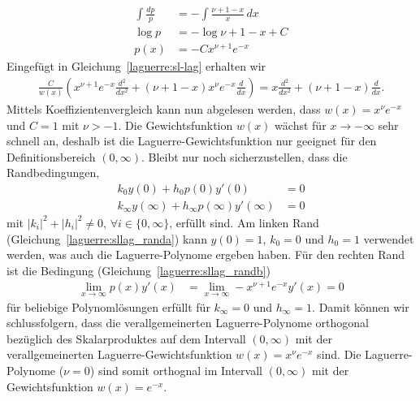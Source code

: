 \begin{align*}
\int \frac{dp}{p}
 & =
-\int \frac{\nu + 1 - x}{x} \, dx
\\
\log p
 & =
-\log \nu + 1 - x + C
\\
p(x)
 & =
-C x^{\nu + 1} e^{-x}
\end{align*}
Eingefügt in Gleichung~\eqref{laguerre:sl-lag} erhalten wir
\begin{align*}
\frac{C}{w(x)}
\left(
x^{\nu+1} e^{-x} \frac{d^2}{dx^2} +
(\nu + 1 - x) x^{\nu} e^{-x} \frac{d}{dx}
\right)
=
x \frac{d^2}{dx^2} + (\nu + 1 - x) \frac{d}{dx}.
\end{align*}
Mittels Koeffizientenvergleich kann nun abgelesen werden, dass $w(x) = x^\nu
e^{-x}$ und $C=1$ mit $\nu > -1$.
Die Gewichtsfunktion $w(x)$ wächst für $x\rightarrow-\infty$ sehr schnell an,
deshalb ist die Laguerre-Gewichtsfunktion nur geeignet für den
Definitionsbereich $(0, \infty)$.
Bleibt nur noch sicherzustellen, dass die Randbedingungen,
\begin{align}
k_0 y(0) + h_0 p(0)y'(0)
 & =
0
\label{laguerre:sllag_randa}
\\
k_\infty y(\infty) + h_\infty p(\infty) y'(\infty)
 & =
0
\label{laguerre:sllag_randb}
\end{align}
mit $|k_i|^2 + |h_i|^2 \neq 0,\,\forall i \in \{0, \infty\}$, erfüllt sind.
Am linken Rand (Gleichung~\eqref{laguerre:sllag_randa}) kann $y(0) = 1$, $k_0 =
0$ und $h_0 = 1$ verwendet werden,
was auch die Laguerre-Polynome ergeben haben.
Für den rechten Rand ist die Bedingung (Gleichung~\eqref{laguerre:sllag_randb})
\begin{align*}
\lim_{x \rightarrow \infty} p(x) y'(x)
 & =
\lim_{x \rightarrow \infty} -x^{\nu + 1} e^{-x} y'(x)
=
0
\end{align*}
für beliebige Polynomlösungen erfüllt für $k_\infty=0$ und $h_\infty=1$.
Damit können wir schlussfolgern, dass die verallgemeinerten Laguerre-Polynome
orthogonal bezüglich des Skalarproduktes auf dem Intervall $(0, \infty)$
mit der verallgemeinerten Laguerre\--Gewichtsfunktion $w(x)=x^\nu e^{-x}$ sind.
Die Laguerre-Polynome ($\nu=0$) sind somit orthognal im Intervall $(0, \infty)$
mit der Gewichtsfunktion $w(x)=e^{-x}$.



